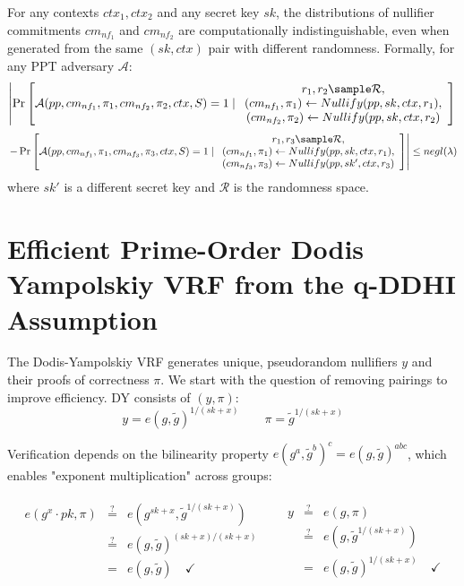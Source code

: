\begin{property}[Unlinkability]
For any contexts $ctx_1, ctx_2$ and any secret key $sk$, the distributions of nullifier commitments $cm_{nf_1}$ and $cm_{nf_2}$ are computationally indistinguishable, even when generated from the same $(sk, ctx)$ pair with different randomness. Formally, for any PPT adversary $\mathcal{A}$:
$$\left|\Pr\left[\mathcal{A}(pp, cm_{nf_1}, \pi_1, cm_{nf_2}, \pi_2, ctx, S) = 1 \mid \begin{array}{c} 
r_1, r_2 \sample \mathcal{R}, \\ 
(cm_{nf_1}, \pi_1) \leftarrow Nullify(pp, sk, ctx, r_1), \\
(cm_{nf_2}, \pi_2) \leftarrow Nullify(pp, sk, ctx, r_2)
\end{array}\right]\right.$$
$$\left. - \Pr\left[\mathcal{A}(pp, cm_{nf_1}, \pi_1, cm_{nf_3}, \pi_3, ctx, S) = 1 \mid \begin{array}{c} 
r_1, r_3 \sample \mathcal{R}, \\ 
(cm_{nf_1}, \pi_1) \leftarrow Nullify(pp, sk, ctx, r_1), \\
(cm_{nf_3}, \pi_3) \leftarrow Nullify(pp, sk', ctx, r_3)
\end{array}\right]\right| \leq negl(\lambda)$$
where $sk'$ is a different secret key and $\mathcal{R}$ is the randomness space.
\end{property}





\section{Efficient Prime-Order Dodis Yampolskiy VRF from the q-DDHI Assumption}\label{sec:vrf-prime-order}

The Dodis-Yampolskiy \cite{hutchison_verifiable_2005} VRF generates unique, pseudorandom nullifiers $y$ and their proofs of correctness $\pi$. We start with the question of removing pairings to improve efficiency. DY consists of $(y, \pi)$:
\[
y = e(g, \tilde{g})^{1/(sk+x)} \qquad \pi = \tilde{g}^{1/(sk+x)}
\]

Verification depends on the bilinearity property $e(g^a, \tilde{g}^b)^c = e(g, \tilde{g})^{abc}$, which enables "exponent multiplication" across groups:

\begin{align*}
    \begin{array}{rcl}
    e(g^x \cdot pk, \pi) & \stackrel{?}{=} & e(g^{sk+x}, \tilde{g}^{1/(sk+x)}) \\
     & \stackrel{?}{=} & e(g, \tilde{g})^{(sk+x)/(sk+x)} \\
     & = & e(g, \tilde{g}) \quad \checkmark
    \end{array}
    &&
    \begin{array}{rcl}
    y & \stackrel{?}{=} & e(g, \pi) \\
     & \stackrel{?}{=} & e(g,\tilde{g}^{1/(sk+x)}) \\
     & = & e(g, \tilde{g})^{1/(sk+x)} \quad \checkmark
    \end{array}
\end{align*}

